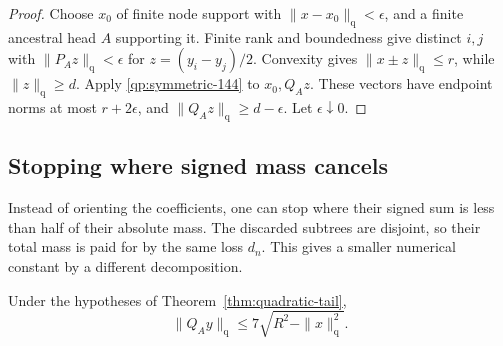 \begin{proof}
Choose $x_0$ of finite node support with
$\|x-x_0\|_{\mathrm q}<\epsilon$, and a finite ancestral head
$A$ supporting it.  Finite rank and boundedness give distinct
$i,j$ with $\|P_Az\|_{\mathrm q}<\epsilon$ for
$z=(y_i-y_j)/2$.  Convexity gives $\|x\pm z\|_{\mathrm q}\le r$,
while $\|z\|_{\mathrm q}\ge d$.  Apply
\eqref{qp:symmetric-144} to $x_0,Q_Az$.  These vectors have endpoint
norms at most $r+2\epsilon$, and
$\|Q_Az\|_{\mathrm q}\ge d-\epsilon$.  Let $\epsilon\downarrow0$.
\end{proof}

\subsection{Stopping where signed mass cancels}

Instead of orienting the coefficients, one can stop where their
signed sum is less than half of their absolute mass.  The discarded
subtrees are disjoint, so their total mass is paid for by the same
loss $d_n$.  This gives a smaller numerical constant by a different
decomposition.

\begin{proposition}\label{qp:tail-seven}
Under the hypotheses of Theorem~\ref{thm:quadratic-tail},
\[
 \|Q_Ay\|_{\mathrm q}\le7\sqrt{R^2-\|x\|_{\mathrm q}^2}.
\]
\end{proposition}

